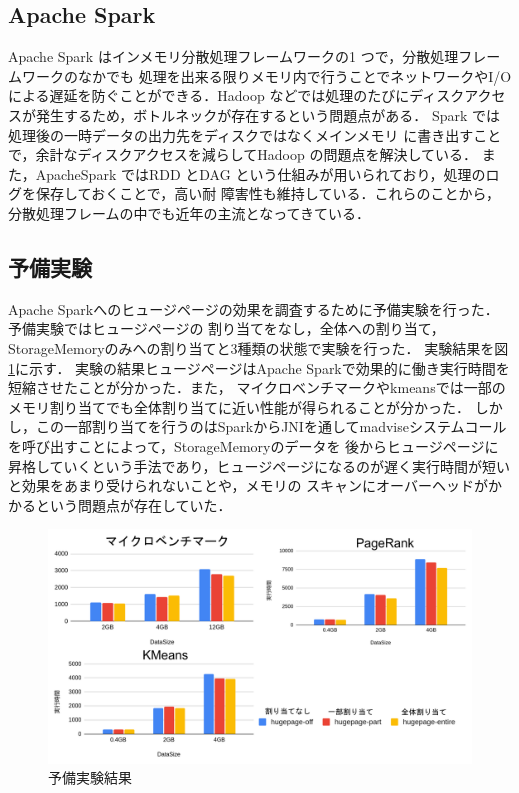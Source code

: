 \subsection{Apache Spark}
Apache Spark はインメモリ分散処理フレームワークの1 つで，分散処理フレームワークのなかでも
処理を出来る限りメモリ内で行うことでネットワークやI/O による遅延を防ぐことができる．Hadoop
などでは処理のたびにディスクアクセスが発生するため，ボトルネックが存在するという問題点がある．
Spark では処理後の一時データの出力先をディスクではなくメインメモリ
に書き出すことで，余計なディスクアクセスを減らしてHadoop の問題点を解決している．
また，ApacheSpark ではRDD\cite{zaharia2012resilient} とDAG\cite{dag} という仕組みが用いられており，処理のログを保存しておくことで，高い耐
障害性も維持している．これらのことから，分散処理フレームの中でも近年の主流となってきている．

\subsection{予備実験}
Apache Sparkへのヒュージページの効果を調査するために予備実験を行った．予備実験ではヒュージページの
割り当てをなし，全体への割り当て，StorageMemoryのみへの割り当てと3種類の状態で実験を行った．
実験結果を図\ref{fig:pre-experiment}に示す．
実験の結果ヒュージページはApache Sparkで効果的に働き実行時間を短縮させたことが分かった．また，
マイクロベンチマークやkmeansでは一部のメモリ割り当てでも全体割り当てに近い性能が得られることが分かった．
しかし，この一部割り当てを行うのはSparkからJNI\cite{jni}を通してmadviseシステムコール\cite{madvise}を呼び出すことによって，StorageMemoryのデータを
後からヒュージページに昇格していくという手法であり，ヒュージページになるのが遅く実行時間が短いと効果をあまり受けられないことや，メモリの
スキャンにオーバーヘッドがかかるという問題点が存在していた．

\begin{figure}
  \centering
  \includegraphics[scale=0.4]{figures/pre-experiment.png}
  \caption{予備実験結果}
  \label{fig:pre-experiment}
\end{figure}